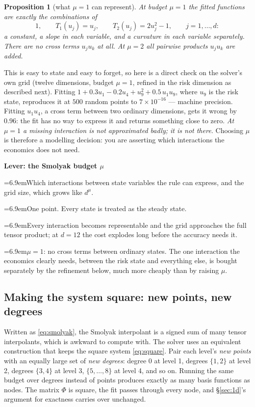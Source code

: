 \documentclass[10pt,a4paper]{article}
\newcommand{\leverrow}[2]{\par\noindent\hangindent=6.9em\hangafter=1\makebox[6.9em][l]{\textit{#1}}#2}
\newenvironment{lever}[1]{\par\begin{framed}\small\noindent\textcolor{levcol}{\textbf{Lever: #1}}\par\vspace{2pt}}{\end{framed}}
\theoremstyle{plain}
\newtheorem{prop}[thm]{Proposition}
\theoremstyle{remark}
\begin{document}
\begin{prop}[what $\mu=1$ can represent]
\label{prop:span}
At budget $\mu=1$ the fitted functions are exactly the combinations of
\[
  1,\qquad T_1(u_j) = u_j,\qquad T_2(u_j) = 2u_j^2-1,\qquad j=1,\dots,d:
\]
a constant, a slope in each variable, and a curvature in each variable \emph{separately}.
There are no cross terms $u_ju_k$ at all. At $\mu=2$ all pairwise products $u_ju_k$ are
added.
\end{prop}

\noindent This is easy to state and easy to forget, so here is a direct check on the solver's
own grid (twelve dimensions, budget $\mu=1$, refined in the risk dimension as described next).
Fitting $1 + 0.3u_1 - 0.2u_4 + u_9^2 + 0.5\,u_1u_9$, where $u_9$ is the risk state,
reproduces it at $500$ random points to $7\times10^{-16}$ --- machine precision. Fitting
$u_1u_4$, a cross term between two ordinary dimensions, gets it wrong by $0.96$: the fit has
no way to express it and returns something close to zero. \emph{At $\mu=1$ a missing
interaction is not approximated badly; it is not there.} Choosing $\mu$ is therefore a
modelling decision: you are asserting which interactions the economics does not need.

\begin{lever}{the Smolyak budget $\mu$}
\leverrow{Controls}{Which interactions between state variables the rule can express, and the
grid size, which grows like $d^{\mu}$.}
\leverrow{Push to 0}{One point. Every state is treated as the steady state.}
\leverrow{Push up}{Every interaction becomes representable and the grid approaches the full
tensor product; at $d=12$ the cost explodes long before the accuracy needs it.}
\leverrow{Here}{$\mu=1$: no cross terms between ordinary states. The one interaction the
economics clearly needs, between the risk state and everything else, is bought separately by
the refinement below, much more cheaply than by raising $\mu$.}
\end{lever}

\subsection{Making the system square: new points, new degrees}

Written as \eqref{eq:smolyak}, the Smolyak interpolant is a signed sum of many tensor
interpolants, which is awkward to compute with. The solver uses an equivalent construction
that keeps the square system \eqref{eq:square}. Pair each level's \emph{new points} with an
equally large set of \emph{new degrees}: degree $0$ at level 1, degrees $\{1,2\}$ at level 2,
degrees $\{3,4\}$ at level 3, $\{5,\dots,8\}$ at level 4, and so on. Running the same budget
over degrees instead of points produces exactly as many basis functions as nodes. The matrix
$\Phi$ is square, the fit passes through every node, and \S\ref{sec:1d}'s argument for
exactness carries over unchanged.
\end{document}

